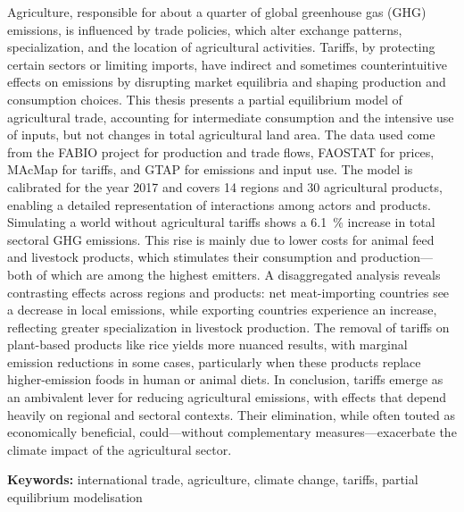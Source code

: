 
Agriculture, responsible for about a quarter of global greenhouse gas (GHG) emissions, is influenced by trade policies, which alter exchange patterns, specialization, and the location of agricultural activities. Tariffs, by protecting certain sectors or limiting imports, have indirect and sometimes counterintuitive effects on emissions by disrupting market equilibria and shaping production and consumption choices. This thesis presents a partial equilibrium model of agricultural trade, accounting for intermediate consumption and the intensive use of inputs, but not changes in total agricultural land area. The data used come from the FABIO project for production and trade flows, FAOSTAT for prices, MAcMap for tariffs, and GTAP for emissions and input use. The model is calibrated for the year 2017 and covers 14 regions and 30 agricultural products, enabling a detailed representation of interactions among actors and products.
Simulating a world without agricultural tariffs shows a 6.1~\% increase in total sectoral GHG emissions. This rise is mainly due to lower costs for animal feed and livestock products, which stimulates their consumption and production—both of which are among the highest emitters. A disaggregated analysis reveals contrasting effects across regions and products: net meat-importing countries see a decrease in local emissions, while exporting countries experience an increase, reflecting greater specialization in livestock production. The removal of tariffs on plant-based products like rice yields more nuanced results, with marginal emission reductions in some cases, particularly when these products replace higher-emission foods in human or animal diets.
In conclusion, tariffs emerge as an ambivalent lever for reducing agricultural emissions, with effects that depend heavily on regional and sectoral contexts. Their elimination, while often touted as economically beneficial, could—without complementary measures—exacerbate the climate impact of the agricultural sector.

\textbf{Keywords:} international trade, agriculture, climate change, tariffs, partial equilibrium modelisation